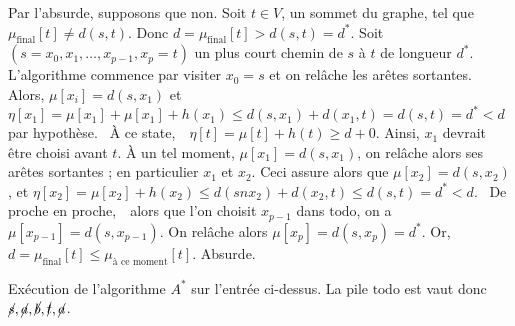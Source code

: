 \documentclass[a4paper]{article}
\begin{document}
	\begin{prv}
		Par l'absurde, supposons que non.
		Soit $t \in V$, un sommet du graphe, tel que $\mu_{\text{final}}[t] \neq d(s,t)$.
		Donc $d = \mu_{\text{final}}[t] > d(s,t) = d^*$.
		Soit $(s = x_0, x_1, \ldots, x_{p-1}, x_p = t)$ un plus court chemin de $s$ à $t$ de longueur $d^*$.
		L'algorithme commence par visiter $x_0 = s$ et on relâche les arêtes sortantes.
		Alors, $\mu[x_i] = d(s, x_1)$ et $\eta[x_1] = \mu[x_1] + \mu[x_1] + h(x_1) \le d(s, x_1) + d(x_1, t) = d(s,t) = d^* < d$ par hypothèse.
		\guillemotleft~À ce state,~\guillemotright\ $\eta[t] = \mu[t] + h(t) \ge d + 0$.
		Ainsi, $x_1$ devrait être choisi avant $t$. À un tel moment, $\mu[x_1] = d(s, x_1)$, on relâche alors ses arêtes sortantes ; en particulier $x_1$ et $x_2$. Ceci assure alors que $\mu[x_2] = d(s, x_2)$, et $\eta[x_2] = \mu[x_2] + h(x_2) \le d(sn x_2) + d(x_2, t) \le d(s,t) = d^* < d$.
		\guillemotleft~De proche en proche,~\guillemotright\ alors que l'on choisit $x_{p-1}$ dans $\mathrm{todo}$, on a $\mu[x_{p-1}] = d(s, x_{p-1})$.
		On relâche alors $\mu[x_p] = d(s, x_p) = d^*$.
		Or, $d = \mu_{\text{final}}[t] \le \mu_{\text{à ce moment}}[t]$. Absurde.
	\end{prv}

	\begin{exm}
		\begin{comment}
			     b (h = 6)
					/ \
			 1 /   \ 1
				/  3  \     5
			 s - - - a - - - - t
		        (h = 0)   (h = 0)
		\end{comment}
		Exécution de l'algorithme $A^*$ sur l'entrée ci-dessus.
		La pile $\mathrm{todo}$ est vaut donc $\cancel s, \cancel a, \cancel b, \cancel t, \cancel a$.
	\end{exm}
\end{document}
